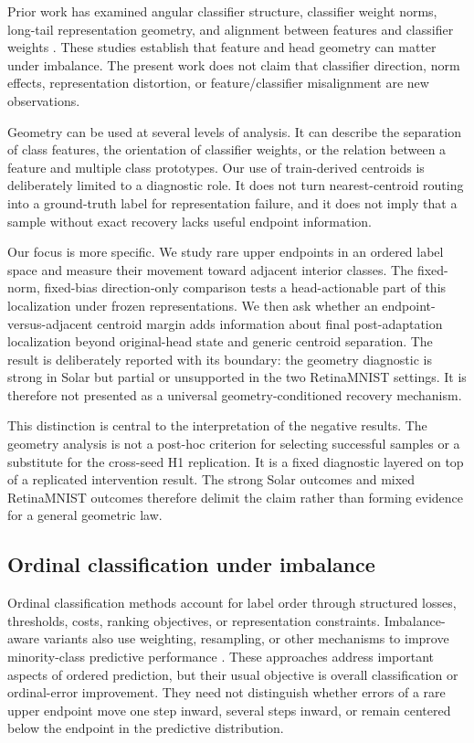 Prior work has examined angular classifier structure, classifier weight norms,
long-tail representation geometry, and alignment between features and
classifier weights
\cite{c2am2022angular,zhu2022balanced,yi2025geometry,wang2026alignment}. These studies establish that feature and head
geometry can matter under imbalance. The present work does not claim that
classifier direction, norm effects, representation distortion, or
feature/classifier misalignment are new observations.

Geometry can be used at several levels of analysis. It can describe the
separation of class features, the orientation of classifier weights, or the
relation between a feature and multiple class prototypes. Our use of
train-derived centroids is deliberately limited to a diagnostic role. It does
not turn nearest-centroid routing into a ground-truth label for representation
failure, and it does not imply that a sample without exact recovery lacks useful
endpoint information.

Our focus is more specific. We study rare upper endpoints in an ordered label
space and measure their movement toward adjacent interior classes. The
fixed-norm, fixed-bias direction-only comparison tests a head-actionable part
of this localization under frozen representations. We then ask whether an
endpoint-versus-adjacent centroid margin adds information about final
post-adaptation localization beyond original-head state and generic centroid
separation. The result is deliberately reported with its boundary: the geometry
diagnostic is strong in Solar but partial or unsupported in the two
RetinaMNIST settings. It is therefore not presented as a universal
geometry-conditioned recovery mechanism.

This distinction is central to the interpretation of the negative results.
The geometry analysis is not a post-hoc criterion for selecting successful
samples or a substitute for the cross-seed H1 replication. It is a fixed
diagnostic layered on top of a replicated intervention result. The strong Solar
outcomes and mixed RetinaMNIST outcomes therefore delimit the claim rather than
forming evidence for a general geometric law.

\subsection{Ordinal classification under imbalance}

Ordinal classification methods account for label order through structured
losses, thresholds, costs, ranking objectives, or representation constraints.
Imbalance-aware variants also use weighting, resampling, or other mechanisms to
improve minority-class predictive performance
\cite{zhu2019smor,lazaro2023bayesian}. These approaches
address important aspects of ordered prediction, but their usual objective is
overall classification or ordinal-error improvement. They need not distinguish
whether errors of a rare upper endpoint move one step inward, several steps
inward, or remain centered below the endpoint in the predictive distribution.

